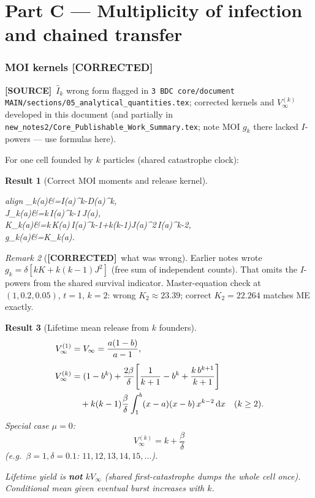 \documentclass[11pt,a4paper]{article}
\newcommand{\dd}{{\rm d}}
\newcommand{\Ihat}{\widehat{I}}
\theoremstyle{plain}
\newtheorem{result}{Result}[section]
\theoremstyle{definition}
\theoremstyle{remark}
\newtheorem{remark}[result]{Remark}
\newcommand{\COR}{\textcolor{green!40!black}{\textbf{[CORRECTED]}}}
\newcommand{\SOURCE}{\textcolor{gray!50!black}{\textbf{[SOURCE]}}}
\begin{document}
\part*{Part C --- Multiplicity of infection and chained transfer}

\section{MOI kernels \COR}
\label{sec:moi}
\SOURCE\
$\Ihat_k$ wrong form flagged in
\texttt{3 BDC core/document MAIN/sections/05\_analytical\_quantities.tex};
corrected kernels and $V_\infty^{(k)}$ developed in this document
(and partially in \texttt{new\_notes2/Core\_Publishable\_Work\_Summary.tex};
note MOI $g_k$ there lacked $I$-powers --- use formulas here).

For one cell founded by $k$ particles (shared catastrophe clock):

\begin{result}[Correct MOI moments and release kernel]
\begin{empheq}[box=\fbox]{align}
\Ihat_k(a)&=I(a)^k-D(a)^k,\\[0.25em]
J_k(a)&=k\,I(a)^{k-1}\,J(a),\\[0.25em]
K_k(a)&=k\,K(a)\,I(a)^{k-1}+k(k-1)J(a)^2\,I(a)^{k-2},\\[0.25em]
g_k(a)&=\delta K_k(a).
\end{empheq}
\end{result}

\begin{remark}[\COR\ what was wrong]
Earlier notes wrote $g_k=\delta[kK+k(k-1)J^2]$ (free sum of independent
counts). That omits the $I$-powers from the shared survival indicator.
Master-equation check at $(1,0.2,0.05)$, $t=1$, $k=2$: wrong $K_2\approx 23.39$;
correct $K_2=22.264$ matches ME exactly.
\end{remark}

\begin{result}[Lifetime mean release from $k$ founders]
\begin{align}
V_\infty^{(1)}&=V_\infty=\frac{a(1-b)}{a-1},\\[0.3em]
V_\infty^{(k)}
&=(1-b^k)
+\frac{2\beta}{\delta}\Biggl[\frac{1}{k+1}-b^k+\frac{k\,b^{k+1}}{k+1}\Biggr]
\nonumber\\
&\quad
+k(k-1)\frac{\beta}{\delta}\int_1^b (x-a)(x-b)\,x^{k-2}\,\dd x
\quad(k\ge 2).
\label{eq:Vk}
\end{align}
Special case $\mu=0$:
\begin{equation}
\boxed{\;V_\infty^{(k)}=k+\frac{\beta}{\delta}\;}
\end{equation}
(e.g.\ $\beta=1,\delta=0.1$: $11,12,13,14,15,\ldots$).

Lifetime yield is \textbf{not} $k V_\infty$ (shared first-catastrophe dumps the
whole cell once). Conditional mean given eventual burst \emph{increases} with $k$.
\end{result}
\end{document}
